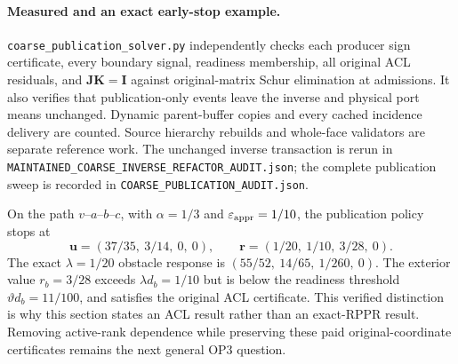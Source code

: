 \paragraph{Measured and an exact early-stop example.}
\texttt{coarse\_publication\_solver.py} independently checks each producer
sign certificate, every boundary signal, readiness membership, all original
ACL residuals, and $\boldsymbol J\boldsymbol K=\boldsymbol I$ against
original-matrix Schur elimination at admissions. It also verifies that
publication-only events leave the inverse and physical port means unchanged.
Dynamic parent-buffer copies and every cached incidence delivery are counted.
Source hierarchy rebuilds and whole-face validators are separate reference
work. The unchanged inverse transaction is rerun in
\texttt{MAINTAINED\_COARSE\_INVERSE\_REFACTOR\_AUDIT.json}; the complete
publication sweep is recorded in \texttt{COARSE\_PUBLICATION\_AUDIT.json}.

On the path $v$--$a$--$b$--$c$, with $\alpha=1/3$ and
$\varepsilon_{\mathrm{appr}}=1/10$, the publication policy stops at
\[
 \boldsymbol u=(37/35,\ 3/14,\ 0,\ 0),\qquad
 \boldsymbol r=(1/20,\ 1/10,\ 3/28,\ 0).
\]
The exact $\lambda=1/20$ obstacle response is
$(55/52,\ 14/65,\ 1/260,\ 0)$. The exterior value $r_b=3/28$ exceeds
$\lambda d_b=1/10$ but is below the readiness threshold
$\vartheta d_b=11/100$, and satisfies the original ACL certificate.
This verified distinction is why this section states an ACL result rather
than an exact-RPPR result. Removing active-rank dependence while preserving
these paid original-coordinate certificates remains the next general OP3
question.
